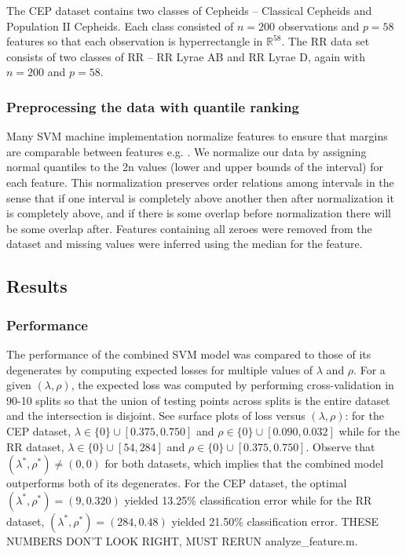\documentclass[10pt]{article}
\theoremstyle{definition}
\begin{document}
The CEP dataset contains two classes of Cepheids --  Classical Cepheids and Population II Cepheids.  Each class consisted of $n=200$ observations and $p=58$ features so that each observation is hyperrectangle in $\mathbb{R}^{58}$. The RR data set consists of two classes of RR --  RR Lyrae AB and RR Lyrae D, again with $n=200$ and $p=58$.

\subsubsection{Preprocessing the data with quantile ranking}
Many SVM machine implementation normalize features to ensure that margins are comparable between features e.g. \cite{dimitriadou2011package}. We normalize our data by assigning normal quantiles to the 2n values (lower and upper bounds of the interval) for each feature. This normalization preserves order relations among intervals in the sense that if one interval is completely above another then after normalization it is completely above, and if there is some overlap before normalization there will be some overlap after. Features containing all zeroes were removed from the dataset and missing values were inferred using the median for the feature.

\subsection{Results}

\subsubsection{Performance}
The performance of the combined SVM model was compared to those of its degenerates by computing expected losses for multiple values of $\lambda$ and $\rho$.  For a given $(\lambda,\rho)$, the expected loss was computed by performing cross-validation in 90-10 splits so that the union of testing points across splits is the entire dataset and the intersection is disjoint. See surface plots of loss versus $(\lambda,\rho)$: for the CEP dataset, $\lambda\in \lbrace 0\rbrace\cup [0.375,0.750]$ and $\rho\in\lbrace 0\rbrace\cup [0.090,0.032]$ while for the RR dataset, $\lambda\in\lbrace 0\rbrace\cup [54,284]$ and $\rho\in\lbrace 0\rbrace\cup [0.375,0.750]$. Observe that $(\lambda^*,\rho^*)\neq (0,0)$ for both datasets, which implies that the combined model outperforms both of its degenerates. For the CEP dataset, the optimal $(\lambda^*,\rho^*)=(9,0.320)$ yielded 13.25\% classification error while for the RR dataset, $(\lambda^*,\rho^*)=(284,0.48)$ yielded 21.50\% classification error. THESE NUMBERS DON'T LOOK RIGHT, MUST RERUN analyze\_feature.m.
\end{document}
